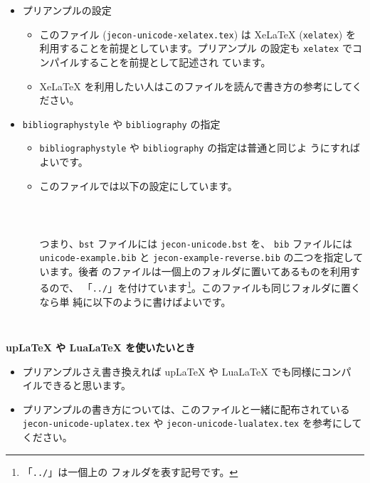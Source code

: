 \documentclass[a4paper,10pt]{bxjsarticle}
\begin{document}
\begin{itemize}
 \item プリアンプルの設定
       \begin{itemize}
        \item このファイル (\texttt{jecon-unicode-xelatex.tex}) は XeLaTeX
              (\texttt{xelatex}) を利用することを前提としています。プリアンプル
              の設定も \texttt{xelatex} でコンパイルすることを前提として記述され
              ています。
        \item XeLaTeX を利用したい人はこのファイルを読んで書き方の参考にしてく
              ださい。
       \end{itemize}
 \item \texttt{bibliographystyle} や \texttt{bibliography} の指定
       \begin{itemize}
        \item \texttt{bibliographystyle} や \texttt{bibliography} の指定は普通と同じよ
       うにすればよいです。
        \item このファイルでは以下の設定にしています。
\begin{verbatim}
           
            
\end{verbatim}
       つまり、\texttt{bst} ファイルには \texttt{jecon-unicode.bst} を、
              \texttt{bib} ファイルには \texttt{unicode-example.bib} と
              \texttt{jecon-example-reverse.bib} の二つを指定しています。後者
              のファイルは一個上のフォルダに置いてあるものを利用するので、
              「\texttt{../}」を付けています\footnote{「\texttt{../}」は一個上の
              フォルダを表す記号です。}。このファイルも同じフォルダに置くなら単
              純に以下のように書けばよいです。
\begin{verbatim}
            
\end{verbatim}
       \end{itemize}
\end{itemize}

\vspace*{1em}

\textbf{upLaTeX や LuaLaTeX を使いたいとき}
\begin{itemize}
        \item プリアンプルさえ書き換えれば upLaTeX や LuaLaTeX でも同様にコンパ
              イルできると思います。
        \item プリアンプルの書き方については、このファイルと一緒に配布されている
              \texttt{jecon-unicode-uplatex.tex} や
              \texttt{jecon-unicode-lualatex.tex} を参考にしてください。
\end{itemize}
\end{document}
